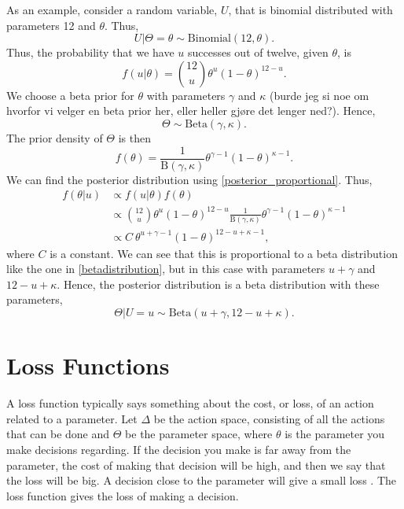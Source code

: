 As an example, consider a random variable, $U$, that is binomial distributed with parameters 12 and $\theta$. Thus,
\begin{equation*}
    U|\Theta=\theta \sim \mathrm{Binomial}(12,\theta).
\end{equation*}
Thus, the probability that we have $u$ successes out of twelve, given $\theta$, is
\begin{equation*}
    f(u|\theta) = \binom{12}{u} \theta^{u} (1-\theta)^{12-u}.
\end{equation*}
We choose a beta prior for $\theta$ with parameters $\gamma$ and $\kappa$ (burde jeg si noe om hvorfor vi velger en beta prior her, eller heller gjøre det lenger ned?). Hence,
\begin{equation*}
    \Theta \sim \mathrm{Beta}(\gamma,\kappa). 
\end{equation*}
The prior density of $\Theta$ is then
\begin{equation}
    \label{betadistribution}
    f(\theta) = \frac{1}{\mathrm{B}(\gamma,\kappa)}\theta^{\gamma-1}(1-\theta)^{\kappa-1}.
\end{equation}
We can find the posterior distribution using \eqref{posterior_proportional}. Thus,
\begin{equation*}
    \begin{aligned}
        f(\theta|u) 
        &\propto f(u|\theta)f(\theta)\\[6pt]
        &\propto \binom{12}{u} \theta^{u} (1-\theta)^{12-u} \frac{1}{\mathrm{B}(\gamma,\kappa)}\theta^{\gamma-1}(1-\theta)^{\kappa-1}\\[6pt]
        &\propto C \: \theta^{u+\gamma-1}(1-\theta)^{12-u+\kappa-1},
    \end{aligned}
\end{equation*}
where $C$ is a constant. We can see that this is proportional to a beta distribution like the one in \eqref{betadistribution}, but in this case with parameters $u+\gamma$ and $12-u+\kappa$. Hence, the posterior distribution is a beta distribution with these parameters, 
\begin{equation*}
    \Theta|U=u \sim \mathrm{Beta}(u+\gamma,12-u+\kappa).
\end{equation*}






\section{Loss Functions}
A loss function typically says something about the cost, or loss, of an action related to a parameter. 
Let $\Delta$ be the action space, consisting of all the actions that can be done and $\Theta$ be the parameter space, where $\theta$ is the parameter you make decisions regarding. If the decision you make is far away from the parameter, the cost of making that decision will be high, and then we say that the loss will be big. A decision close to the parameter will give a small loss \citep{statinf}. The loss function gives the loss of making a decision. 

